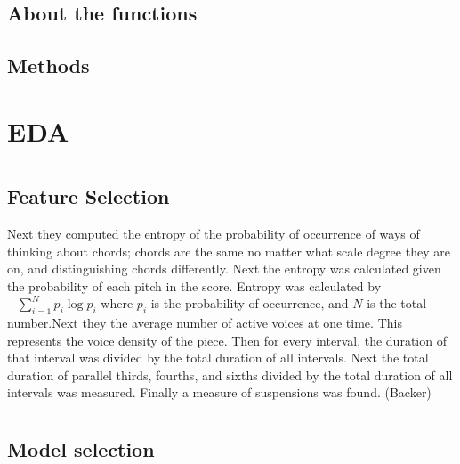 \documentclass[12pt,twoside]{reedthesis}
\theoremstyle{definition}
\theoremstyle{definition}
\theoremstyle{definition}
\theoremstyle{remark}
\begin{document}
\section{About the functions}\label{about-the-functions}

\section{Methods}\label{methods}

\chapter{EDA}\label{eda}

\chapter{}\label{section-2}

\section{Feature Selection}\label{feature-selection}

Next they computed the entropy of the probability of occurrence of ways
of thinking about chords; chords are the same no matter what scale
degree they are on, and distinguishing chords differently. Next the
entropy was calculated given the probability of each pitch in the score.
Entropy was calculated by \(-\sum_{i = 1}^{N}p_i\log{p_i}\) where
\(p_i\) is the probability of occurrence, and \(N\) is the total
number.Next they the average number of active voices at one time. This
represents the voice density of the piece. Then for every interval, the
duration of that interval was divided by the total duration of all
intervals. Next the total duration of parallel thirds, fourths, and
sixths divided by the total duration of all intervals was measured.
Finally a measure of suspensions was found. (Backer)

\chapter{}\label{section-3}

\section{Model selection}\label{model-selection}

\chapter{}\label{section-4}
\end{document}
